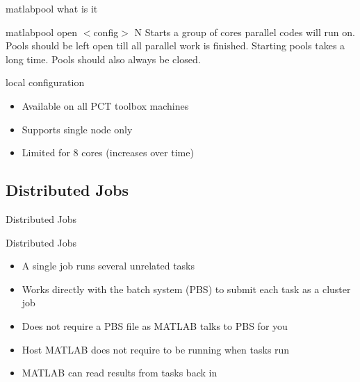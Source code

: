 \documentclass[handout]{beamer}
\begin{document}
\begin{frame}{matlabpool what is it}
  \begin{block}{matlabpool open $<$config$>$ N}
   Starts a group of cores parallel codes will run on. Pools should be left open till all parallel work is finished. Starting pools takes a long time.  Pools should also always be closed.
  \end{block}
  \begin{block}{local configuration}
   \begin{itemize}
    \item Available on all PCT toolbox machines
    \item Supports single node only
    \item Limited for 8 cores (increases over time)
   \end{itemize}
  \end{block}
\end{frame}

   \subsection{Distributed Jobs}
   \begin{frame}{Distributed Jobs}
    \begin{block}{Distributed Jobs}
     \begin{itemize}
      \item A single job runs several unrelated tasks
      \item Works directly with the batch system (PBS) to submit each task as a cluster job
      \item Does not require a PBS file as MATLAB talks to PBS for you
      \item Host MATLAB does not require to be running when tasks run
      \item MATLAB can read results from tasks back in
     \end{itemize}
    \end{block}
   \end{frame}
\end{document}
